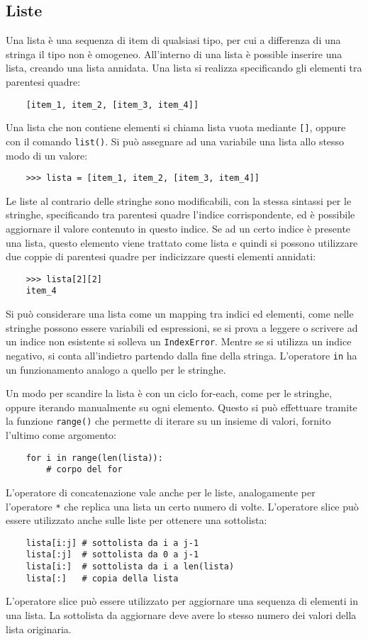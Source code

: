 \documentclass{article}
\numberwithin{equation}{subsection}
\begin{document}
\subsection{Liste}

Una lista è una sequenza di item di qualsiasi tipo, per cui a differenza di una stringa il tipo non è omogeneo. All'interno di una lista è possible 
inserire una lista, creando una lista annidata.  
Una lista si realizza specificando gli elementi tra parentesi quadre:
\begin{verbatim}
    [item_1, item_2, [item_3, item_4]]
\end{verbatim}

Una lista che non contiene elementi si chiama lista vuota mediante \verb|[]|, oppure con il comando \verb|list()|. Si può assegnare ad una variabile una lista allo 
stesso modo di un valore:
\begin{verbatim}
    >>> lista = [item_1, item_2, [item_3, item_4]]
\end{verbatim}

Le liste al contrario delle stringhe sono modificabili, con la stessa sintassi per le stringhe, specificando tra parentesi quadre l'indice corrispondente, ed è possibile 
aggiornare il valore contenuto in questo indice. Se ad un certo indice è presente una lista, questo elemento viene trattato come lista e quindi si possono utilizzare 
due coppie di parentesi quadre per indicizzare questi elementi annidati:
\begin{verbatim}
    >>> lista[2][2]
    item_4
\end{verbatim}
Si può considerare una lista come un mapping tra indici ed elementi, come nelle stringhe possono essere variabili ed espressioni, se si prova a leggere o scrivere 
ad un indice non esistente si solleva un \verb|IndexError|. Mentre se si utilizza un indice negativo, si conta all'indietro partendo dalla fine della stringa. 
L'operatore \verb|in| ha un funzionamento analogo a quello per le stringhe. 

Un modo per scandire la lista è con un ciclo for-each, come per le stringhe, oppure iterando manualmente su ogni elemento. Questo si può effettuare tramite 
la funzione \verb|range()| che permette di iterare su un insieme di valori, fornito l'ultimo come argomento:
\begin{verbatim}
    for i in range(len(lista)):
        # corpo del for
\end{verbatim}

L'operatore di concatenazione vale anche per le liste, analogamente per l'operatore \verb|*| che replica una lista un certo numero di volte. 
L'operatore slice può essere utilizzato anche sulle liste per ottenere una sottolista:
\begin{verbatim}
    lista[i:j] # sottolista da i a j-1
    lista[:j]  # sottolista da 0 a j-1
    lista[i:]  # sottolista da i a len(lista)
    lista[:]   # copia della lista
\end{verbatim}
L'operatore slice può essere utilizzato per aggiornare una sequenza di elementi in una lista. La sottolista da aggiornare deve avere lo stesso numero dei valori della 
lista originaria. 
\end{document}
